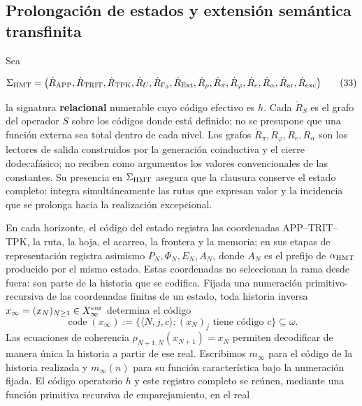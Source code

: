 \subsection{Prolongación de estados y extensión semántica transfinita}

Sea

\[
 \Sigma_{\rm HMT}
 =\bigl(\dot R_{\rm APP},\dot R_{\rm TRIT},\dot R_{\rm TPK},
 \dot R_{U},\dot R_{\Gamma_9},\dot R_{\rm Ext},\dot R_\rho,
 \dot R_{\pi},\dot R_{\varphi},\dot R_e,\dot R_{\alpha},
 \dot R_{\rm ar},\dot R_{\rm exc}\bigr)
\tag{33}\label{hmtfg:base:eq:ch-signatura}
\]

la signatura \textbf{relacional} numerable cuyo código efectivo es \(h\). Cada
\(\dot R_S\) es el grafo del operador \(S\) sobre los códigos donde está
definido; no se presupone que una función externa sea total dentro de cada
nivel. Los grafos \(\dot R_{\pi},\dot R_{\varphi},\dot R_e,\dot R_{\alpha}\)
son los lectores de salida construidos por la generación coinductiva y el
cierre dodecafásico; no reciben como argumentos los valores convencionales de
las constantes. Su presencia en \(\Sigma_{\rm HMT}\) asegura que la clausura
conserve el estado completo: integra simultáneamente las rutas que expresan
valor y la incidencia que se prolonga hacia la realización excepcional.

En cada horizonte, el código del estado registra las coordenadas APP--TRIT--TPK,
la ruta, la hoja, el acarreo, la frontera y la memoria; en sus etapas de
representación registra asimismo \(P_N,\Phi_N,E_N,A_N\), donde
\(A_N\) es el prefijo de \(\alpha_{\rm HMT}\) producido por el mismo estado.
Estas coordenadas no seleccionan la rama desde fuera: son parte de la historia
que se codifica. Fijada una numeración primitivo-recursiva de las coordenadas finitas de
un estado, toda historia inversa
\(x_\infty=(x_N)_{N\geq1}\in X_\infty^{\rm enr}\) determina el código
\[
 \operatorname{code}(x_\infty)
 :=\{\langle N,j,c\rangle:(x_N)_j\text{ tiene código }c\}\subseteq\omega.
\]
Las ecuaciones de coherencia
\(\rho_{N+1,N}(x_{N+1})=x_N\) permiten decodificar de manera única la
historia a partir de ese real. Escribimos \(m_\infty\) para el código de la
historia realizada y \(m_\infty(n)\) para su función característica bajo la
numeración fijada. El código operatorio \(h\) y este registro completo se
reúnen, mediante una función primitiva recursiva de emparejamiento, en el real

